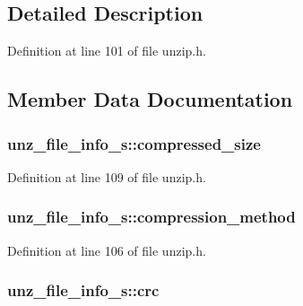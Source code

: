 \subsection{Detailed Description}


Definition at line 101 of file unzip.\+h.



\subsection{Member Data Documentation}
\hypertarget{structunz__file__info__s_a35ee9d733879c87565e40a545fe46fb6}{
\subsubsection[{compressed\+\_\+size}]{ unz\+\_\+file\+\_\+info\+\_\+s\+::compressed\+\_\+size}}\label{structunz__file__info__s_a35ee9d733879c87565e40a545fe46fb6}


Definition at line 109 of file unzip.\+h.

\hypertarget{structunz__file__info__s_aaaca88f0ebec5c1cfebb436b8e70a774}{
\subsubsection[{compression\+\_\+method}]{ unz\+\_\+file\+\_\+info\+\_\+s\+::compression\+\_\+method}}\label{structunz__file__info__s_aaaca88f0ebec5c1cfebb436b8e70a774}


Definition at line 106 of file unzip.\+h.

\hypertarget{structunz__file__info__s_a6d741cb2df07794d7a4794841148893b}{
\subsubsection[{crc}]{ unz\+\_\+file\+\_\+info\+\_\+s\+::crc}}\label{structunz__file__info__s_a6d741cb2df07794d7a4794841148893b}



